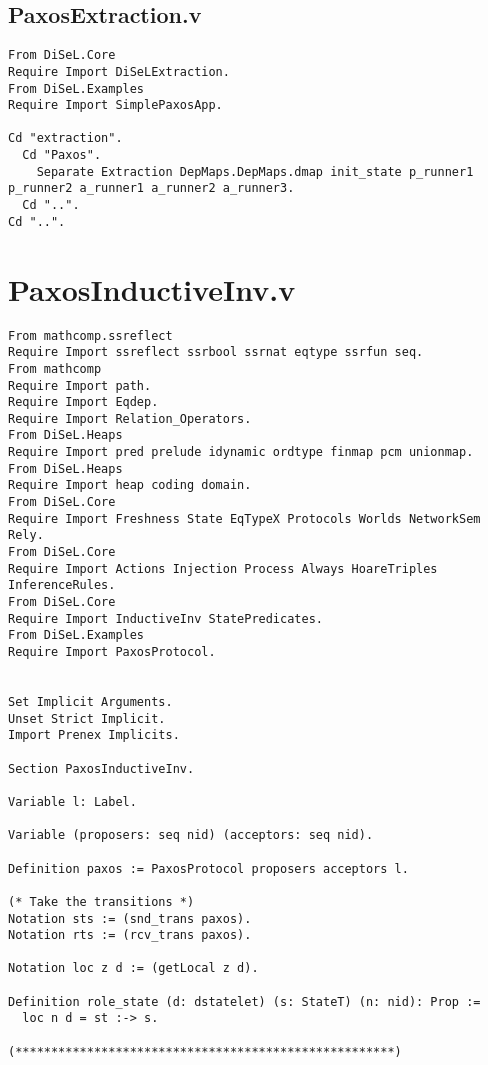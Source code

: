 \begin{landscape}
\begin{multicols*}{2}
\section{PaxosExtraction.v}
\begin{lstlisting}[style=SourceCodeListing]
From DiSeL.Core
Require Import DiSeLExtraction.
From DiSeL.Examples
Require Import SimplePaxosApp.

Cd "extraction".
  Cd "Paxos".
    Separate Extraction DepMaps.DepMaps.dmap init_state p_runner1 p_runner2 a_runner1 a_runner2 a_runner3.
  Cd "..".
Cd "..".
\end{lstlisting}
\end{multicols*}

\newpage

\section{PaxosInductiveInv.v}
\begin{multicols*}{2}
\begin{lstlisting}[style=SourceCodeListing]
From mathcomp.ssreflect
Require Import ssreflect ssrbool ssrnat eqtype ssrfun seq.
From mathcomp
Require Import path.
Require Import Eqdep.
Require Import Relation_Operators.
From DiSeL.Heaps
Require Import pred prelude idynamic ordtype finmap pcm unionmap.
From DiSeL.Heaps
Require Import heap coding domain.
From DiSeL.Core
Require Import Freshness State EqTypeX Protocols Worlds NetworkSem Rely.
From DiSeL.Core
Require Import Actions Injection Process Always HoareTriples InferenceRules.
From DiSeL.Core
Require Import InductiveInv StatePredicates.
From DiSeL.Examples
Require Import PaxosProtocol.


Set Implicit Arguments.
Unset Strict Implicit.
Import Prenex Implicits.

Section PaxosInductiveInv.

Variable l: Label.

Variable (proposers: seq nid) (acceptors: seq nid).

Definition paxos := PaxosProtocol proposers acceptors l.

(* Take the transitions *)
Notation sts := (snd_trans paxos).
Notation rts := (rcv_trans paxos).

Notation loc z d := (getLocal z d).

Definition role_state (d: dstatelet) (s: StateT) (n: nid): Prop :=
  loc n d = st :-> s.

(*****************************************************)


\end{lstlisting}
\end{multicols*}
\end{landscape}

